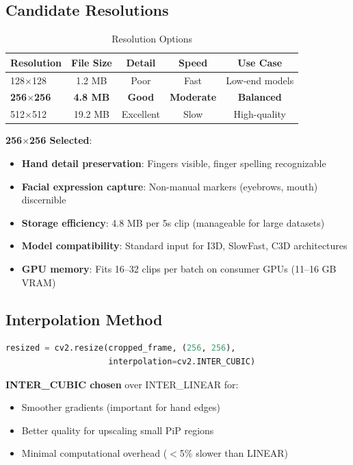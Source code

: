 \documentclass[11pt,a4paper]{article}
\begin{document}
\subsection{Candidate Resolutions}

\begin{table}[htbp]
\centering
\caption{Resolution Options}
\begin{tabular}{@{}lcccc@{}}
\toprule
\textbf{Resolution} & \textbf{File Size} & \textbf{Detail} & \textbf{Speed} & \textbf{Use Case} \\ \midrule
128$\times$128 & 1.2 MB & Poor & Fast & Low-end models \\
\textbf{256$\times$256} & \textbf{4.8 MB} & \textbf{Good} & \textbf{Moderate} & \textbf{Balanced} \\
512$\times$512 & 19.2 MB & Excellent & Slow & High-quality \\
\bottomrule
\end{tabular}
\end{table}

\textbf{256$\times$256 Selected}:
\begin{itemize}
    \item \textbf{Hand detail preservation}: Fingers visible, finger spelling recognizable
    \item \textbf{Facial expression capture}: Non-manual markers (eyebrows, mouth) discernible
    \item \textbf{Storage efficiency}: 4.8 MB per 5s clip (manageable for large datasets)
    \item \textbf{Model compatibility}: Standard input for I3D, SlowFast, C3D architectures
    \item \textbf{GPU memory}: Fits 16--32 clips per batch on consumer GPUs (11--16 GB VRAM)
\end{itemize}

\subsection{Interpolation Method}

\begin{lstlisting}[language=Python]
resized = cv2.resize(cropped_frame, (256, 256), 
                     interpolation=cv2.INTER_CUBIC)
\end{lstlisting}

\textbf{INTER\_CUBIC chosen} over INTER\_LINEAR for:
\begin{itemize}
    \item Smoother gradients (important for hand edges)
    \item Better quality for upscaling small PiP regions
    \item Minimal computational overhead ($<$5\% slower than LINEAR)
\end{itemize}
\end{document}
